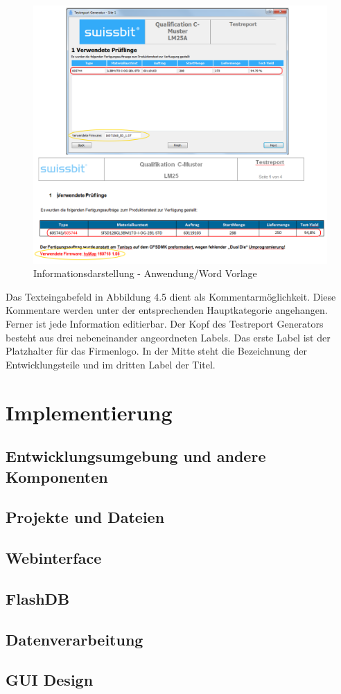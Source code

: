 \begin{figure}[H]
\centering
\includegraphics[scale=0.4]{images/guiSite1}
\caption{Informationsdarstellung - Anwendung/Word Vorlage}
\label{fig:Informationsdarstellung GUI}
\end{figure}
Das Texteingabefeld in Abbildung 4.5 dient als Kommentarmöglichkeit. Diese Kommentare werden unter der entsprechenden Hauptkategorie angehangen. Ferner ist jede Information editierbar. Der Kopf des Testreport Generators besteht aus drei nebeneinander angeordneten Labels. Das erste Label ist der Platzhalter für das Firmenlogo. In der Mitte steht die Bezeichnung der Entwicklungsteile und im dritten Label der Titel.

\section{Implementierung}

\subsection{Entwicklungsumgebung und andere Komponenten}

\subsection{Projekte und Dateien}

\subsection{Webinterface}

\subsection{FlashDB}

\subsection{Datenverarbeitung}

\subsection{GUI Design}
